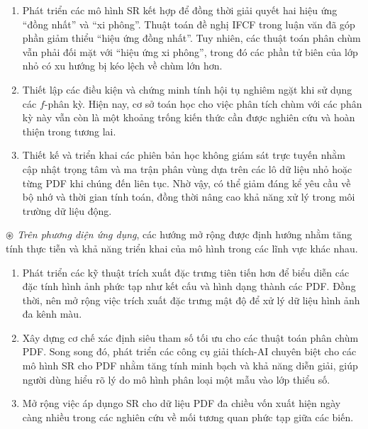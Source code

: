 \documentclass[a4paper,oneside]{book} %
\theoremstyle{plain}
\theoremstyle{plain}
\theoremstyle{nonumberplain}
\begin{document}
\begin{enumerate}[label=(\roman*), leftmargin=2em, itemsep=1ex]
	\item {Phát triển các mô hình SR kết hợp} để đồng thời giải quyết hai hiệu ứng “đồng nhất” và “xi phông”. Thuật toán đề nghị IFCF trong luận văn đã góp phần giảm thiểu “hiệu ứng đồng nhất”. Tuy nhiên, các thuật toán phân chùm vẫn phải đối mặt với “hiệu ứng xi phông”, trong đó các phần tử biên của lớp nhỏ có xu hướng bị kéo lệch về chùm lớn hơn.
	
	\item {Thiết lập các điều kiện và chứng minh tính hội tụ nghiêm ngặt} khi sử dụng các $f$-phân kỳ. Hiện nay, cơ sở toán học cho việc phân tích chùm với các phân kỳ này vẫn còn là một khoảng trống kiến thức cần được nghiên cứu và hoàn thiện trong tương lai.
	
	\item {Thiết kế và triển khai các phiên bản học không giám sát trực tuyến} nhằm cập nhật trọng tâm và ma trận phân vùng dựa trên các lô dữ liệu nhỏ hoặc từng PDF khi chúng đến liên tục. Nhờ vậy, có thể giảm đáng kể yêu cầu về bộ nhớ và thời gian tính toán, đồng thời nâng cao khả năng xử lý trong môi trường dữ liệu động.
\end{enumerate}




\textit{$\circledast$ Trên phương diện ứng dụng}, các hướng mở rộng được định hướng nhằm tăng tính thực tiễn và khả năng triển khai của mô hình trong các lĩnh vực khác nhau.
\begin{enumerate}[label=(\roman*), leftmargin=2em, itemsep=1ex]	
	\item Phát triển các kỹ thuật trích xuất đặc trưng tiên tiến hơn để biểu diễn các đặc tính hình ảnh phức tạp như kết cấu và hình dạng thành các PDF. Đồng thời, nên mở rộng việc trích xuất đặc trưng mật độ để xử lý dữ liệu hình ảnh đa kênh màu.
	\item Xây dựng cơ chế xác định siêu tham số tối ưu cho các thuật toán phân chùm PDF. Song song đó, phát triển các công cụ giải thích-AI chuyên biệt cho các mô hình SR cho PDF nhằm tăng tính minh bạch và khả năng diễn giải, giúp người dùng hiểu rõ lý do mô hình phân loại một mẫu vào lớp thiểu số.
	\item Mở rộng việc áp dụngo SR cho dữ liệu PDF đa chiều vốn xuất hiện ngày càng nhiều trong các nghiên cứu về mối tương quan phức tạp giữa các biến.
\end{enumerate}
\end{document}
